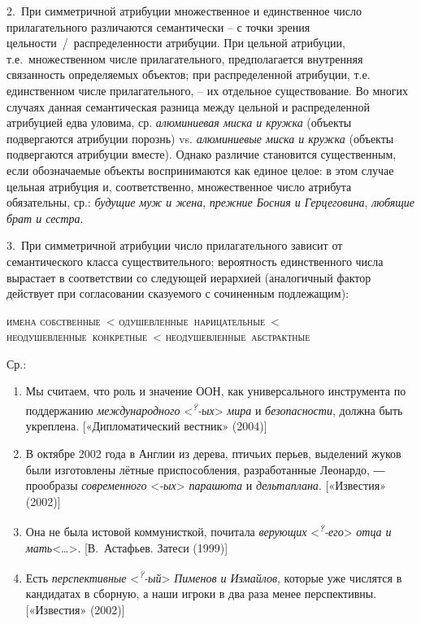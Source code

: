 2.~При симметричной атрибуции множественное и единственное число
прилагательного различаются семантически -- с точки зрения
цельности~/~распределенности атрибуции. При цельной атрибуции,
т.е.~множественном числе прилагательного, предполагается внутренняя
связанность определяемых объектов; при распределенной атрибуции, т.е.
единственном числе прилагательного, -- их отдельное существование. Во
многих случаях данная семантическая разница между цельной и
распределенной атрибуцией едва уловима, ср. \emph{алюминиевая миска и
кружка} (объекты подвергаются атрибуции порознь) vs. \emph{алюминиевые
миска и кружка} (объекты подвергаются атрибуции вместе). Однако различие
становится существенным, если обозначаемые объекты воспринимаются как
единое целое: в этом случае цельная атрибуция и, соответственно,
множественное число атрибута обязательны, ср.: \emph{будущие муж и
жена}, \emph{прежние Босния и Герцеговина}, \emph{любящие брат и
сестра}.

3.~При симметричной атрибуции число прилагательного зависит от
семантического класса существительного; вероятность единственного числа
вырастает в соответствии со следующей иерархией (аналогичный фактор
действует при согласовании сказуемого с сочиненным подлежащим):

\textsc{имена собственные~\textless{}
одушевленные~нарицательные~\textless{}
неодушевленные~конкретные~\textless{} неодушевленные~абстрактные}

Ср.:

\begin{enumerate}
\def\labelenumi{(\arabic{enumi})}
\setcounter{enumi}{127}
\item
  Мы считаем, что роль и значение ООН, как универсального инструмента по
  поддержанию \emph{международного}
  \textless{}\emph{\textsuperscript{?}-ых}\textgreater{} \emph{мира} и
  \emph{безопасности}, должна быть укреплена. {[}«Дипломатический
  вестник» (2004){]}
\item
  В октябре 2002 года в Англии из дерева, птичьих перьев, выделений
  жуков были изготовлены лётные приспособления, разработанные Леонардо,
  ― прообразы \emph{современного} \textless{}\emph{-ых}\textgreater{}
  \emph{парашюта} и \emph{дельтаплана}. {[}«Известия» (2002){]}
\item
  Она не была истовой коммунисткой, почитала \emph{верующих}
  \textless{}\emph{\textsuperscript{?}-его}\textgreater{} \emph{отца и
  мать}\textless\ldots\textgreater. {[}В.~Астафьев. Затеси (1999){]}
\item
  Есть \emph{перспективные}
  \textless{}\emph{\textsuperscript{?}-ый}\textgreater{} \emph{Пименов и
  Измайлов}, которые уже числятся в кандидатах в сборную, а наши игроки
  в два раза менее перспективны. {[}«Известия» (2002){]}
\end{enumerate}

